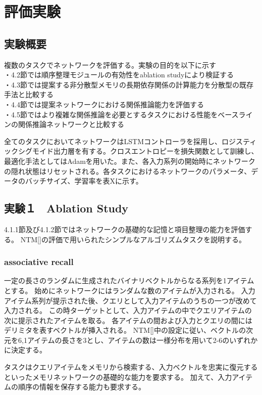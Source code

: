 \chapter{評価実験}

\label{chap:evaluation}

\section{実験概要}

複数のタスクでネットワークを評価する。実験の目的を以下に示す
\\・4.2節では順序整理モジュールの有効性をablation studyにより検証する
\\・4.3節では提案する非分散型メモリの長期依存関係の計算能力を分散型の既存手法と比較する
\\・4.4節では提案ネットワークにおける関係推論能力を評価する
\\・4.5節ではより複雑な関係推論を必要とするタスクにおける性能をベースラインの関係推論ネットワークと比較する

全てのタスクにおいてネットワークはLSTMコントローラを採用し、ロジスティックシグモイド出力層を有する。クロスエントロピーを損失関数として訓練し、最適化手法としてはAdamを用いた。また、各入力系列の開始時にネットワークの隠れ状態はリセットされる。各タスクにおけるネットワークのパラメータ、データのバッチサイズ、学習率を表Xに示す。


\section{実験１　Ablation Study}
4.1.1節及び4.1.2節ではネットワークの基礎的な記憶と項目整理の能力を評価する。
NTM[]の評価で用いられたシンプルなアルゴリズムタスクを説明する。

\subsection{associative recall}
一定の長さのランダムに生成されたバイナリベクトルからなる系列を1アイテムとする。
始めにネットワークにはランダムな数のアイテムが入力される。
入力アイテム系列が提示された後、クエリとして入力アイテムのうちの一つが改めて入力される。
この時ターゲットとして、入力アイテムの中でクエリアイテムの次に提示されたアイテムを取る。
各アイテムの間および入力とクエリの間にはデリミタを表すベクトルが挿入される。
NTM[]中の設定に従い、ベクトルの次元を6,1アイテムの長さを3とし、アイテムの数は一様分布を用いて2-6のいずれかに決定する。

タスクはクエリアイテムをメモリから検索する、入力ベクトルを忠実に復元するといったメモリネットワークの基礎的な能力を要求する。
加えて、入力アイテムの順序の情報を保存する能力も要求する。

